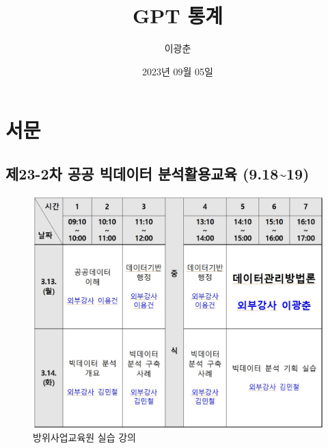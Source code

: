 \documentclass[
  letterpaper,
  chapter,a4paper,showtrims,openright,hidelinks]{oblivoir}
\title{GPT 통계}
\author{이광춘}
\date{2023년 09월 05일}
\renewcommand*\contentsname{목차}
\newcommand\contentsname{목차}
\begin{document}
\maketitle
\renewcommand*\contentsname{목차}
{
\hypersetup{linkcolor=}
\setcounter{tocdepth}{2}
\tableofcontents
}

\hypertarget{uxc11cuxbb38}{%
\chapter*{서문}\label{uxc11cuxbb38}}


\hypertarget{uxc81c23-2uxcc28-uxacf5uxacf5-uxbe45uxb370uxc774uxd130-uxbd84uxc11duxd65cuxc6a9uxad50uxc721-9.1819}{%
\section*{제23-2차 공공 빅데이터 분석활용교육
(9.18\textasciitilde19)}\label{uxc81c23-2uxcc28-uxacf5uxacf5-uxbe45uxb370uxc774uxd130-uxbd84uxc11duxd65cuxc6a9uxad50uxc721-9.1819}}


\begin{figure}

{\centering \includegraphics{images/kdefense_timetable.jpg}

}

\caption{방위사업교육원 실습 강의}

\end{figure}
\end{document}
